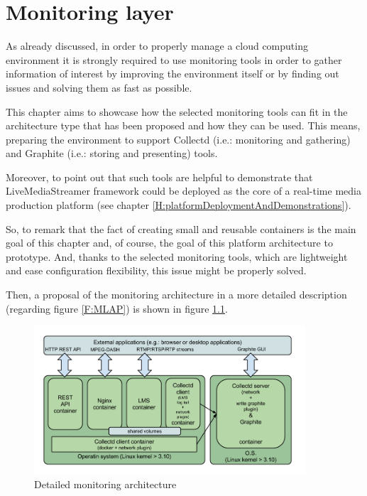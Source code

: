 \chapter{Monitoring layer}\label{G:monitoringLayer}

As already discussed, in order to properly manage a cloud computing environment it is strongly required to use monitoring tools in order to gather information of interest by improving the environment itself or by finding out issues and solving them as fast as possible.

This chapter aims to showcase how the selected monitoring tools can fit in the architecture type that has been proposed and how they can be used. This means, preparing the environment to support Collectd (i.e.: monitoring and gathering) and Graphite (i.e.: storing and presenting) tools.

Moreover, to point out that such tools are helpful to demonstrate that LiveMediaStreamer framework could be deployed as the core of a real-time media production platform (see chapter \ref{H:platformDeploymentAndDemonstrations}).

So, to remark that the fact of creating small and reusable containers is the main goal of this chapter and, of course, the goal of this platform architecture to prototype. And, thanks to the selected monitoring tools, which are lightweight and ease configuration flexibility, this issue might be properly solved.

Then, a proposal of the monitoring architecture in a more detailed description (regarding figure \ref{F:MLAP}) is shown in figure \ref{F:maex}.

\begin{figure}[htb]
\begin{center}
\includegraphics[width=0.9\textwidth]{./images/monitArchProp.png}
\caption{Detailed monitoring architecture}
\label{F:maex}
\end{center}
\end{figure}

